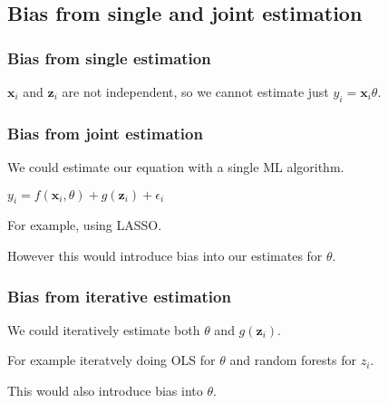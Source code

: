 
\subsection{Bias from single and joint estimation}

\subsubsection{Bias from single estimation}

\(\mathbf x_i\) and \(\mathbf z_i\) are not independent, so we cannot estimate just \(y_i=\mathbf x_i\theta \).

\subsubsection{Bias from joint estimation}

We could estimate our equation with a single ML algorithm.

\(y_i=f(\mathbf x_i, \theta) +g(\mathbf z_i) +\epsilon_i\)

For example, using LASSO.

However this would introduce bias into our estimates for \(\theta \).

\subsubsection{Bias from iterative estimation}

We could iteratively estimate both \(\theta \) and \(g(\mathbf z_i)\).

For example iteratvely doing OLS for \(\theta \) and random forests for \(z_i\).

This would also introduce bias into \(\theta \).

